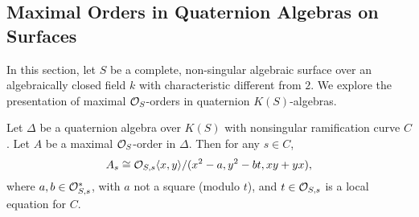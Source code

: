 \subsection{Maximal Orders in Quaternion Algebras on Surfaces}
In this section, let $S$ be a complete, non-singular algebraic surface over an algebraically closed field $k$ with characteristic different from $2$.  We explore the presentation of maximal $\mathcal{O}_S$-orders in quaternion $K(S)$-algebras.
\begin{prop}
Let $\Delta$ be a quaternion algebra over $K(S)$ with nonsingular ramification curve $C$.  Let $A$ be a maximal $\mathcal{O}_S$-order in $\Delta$.  Then for any $s\in C$,
$$A_s \cong \mathcal{O}_{S,s}\langle x,y\rangle/(x^2-a,y^2-bt,xy+yx),$$
where $a,b\in\mathcal{O}_{S,s}^*$, with $a$ not a square (modulo $t$), and $t\in \mathcal{O}_{S,s}$ is a local equation for $C$.
\end{prop}
